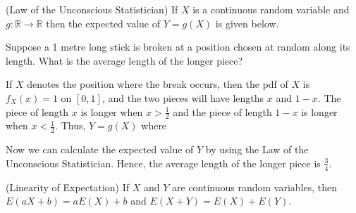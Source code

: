 \begin{thm}(Law of the Unconscious Statistician) If $X$ is a continuous random variable and $g:\mathbb{R} \to \mathbb{R}$ then the expected value of $Y = g(X)$ is given below.
\end{thm}

\begin{examp}Suppose a 1 metre long stick is broken at a position chosen at random along its length. What is the average length of the longer piece?
\par
\noindent If $X$ denotes the position where the break occurs, then the pdf of $X$ is $f_X(x) = 1$ on $[0,1]$, and the two pieces will have lengths $x$ and $1-x$. The piece of length $x$ is longer when $x > \frac{1}{2}$ and the piece of length $1-x$ is longer when $x < \frac{1}{2}$. Thus, $Y = g(X)$ where
\renewcommand*{\arraystretch}{1.35}
\renewcommand*{\arraystretch}{1}
\par
\noindent Now we can calculate the expected value of $Y$ by using the Law of the Unconscious Statistician.
Hence, the average length of the longer piece is $\frac{3}{4}$.
\end{examp}
\vspace{0.1em}
\begin{prop}(Linearity of Expectation) If $X$ and $Y$ are continuous random variables, then $E(aX+b) = aE(X)+b$ and $E(X+Y) = E(X)+E(Y)$.
\end{prop}
\par
